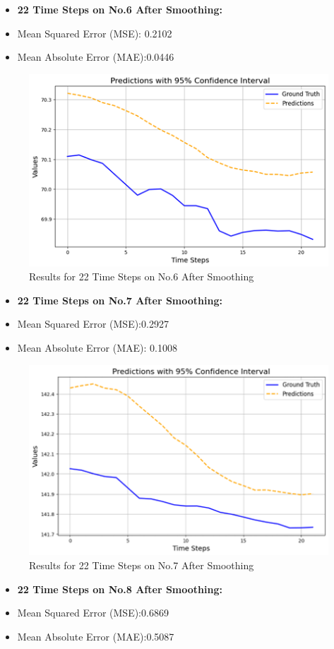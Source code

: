\begin{itemize}
	\item \textbf{22 Time Steps on No.6 After Smoothing:}
	\item Mean Squared Error (MSE): 0.2102
	\item Mean Absolute Error (MAE):0.0446
\end{itemize}
\begin{figure}[h!]
	\centering
	\includegraphics[width=0.8\linewidth]{figures/22no6}
	\caption{Results for 22 Time Steps  on No.6 After Smoothing}
	\label{fig:22no6}
\end{figure}
\begin{itemize}
	\item \textbf{22 Time Steps on No.7 After Smoothing:}
	\item Mean Squared Error (MSE):0.2927
	\item Mean Absolute Error (MAE): 0.1008
\end{itemize}
\begin{figure}[h!]
	\centering
	\includegraphics[width=0.8\linewidth]{figures/22no7}
	\caption{Results for 22 Time Steps  on No.7 After Smoothing}
	\label{fig:22no7}
\end{figure}
\begin{itemize}
	\item \textbf{22 Time Steps on No.8 After Smoothing:}
	\item Mean Squared Error (MSE):0.6869
	\item Mean Absolute Error (MAE):0.5087
\end{itemize}
